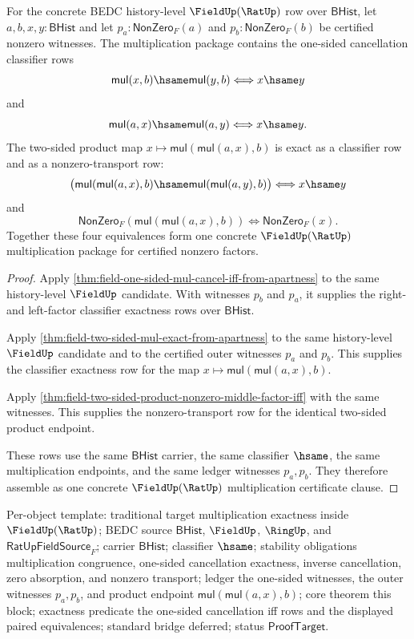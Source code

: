 \begin{theorem}
\label{thm:ratup-fieldup-product-classifier-and-nonzero-exit-package}
For the concrete BEDC history-level $\FieldUp(\RatUp)$ row over
$\mathsf{BHist}$, let $a,b,x,y:\mathsf{BHist}$ and let
$p_a:\mathsf{NonZero}_F(a)$ and $p_b:\mathsf{NonZero}_F(b)$ be certified
nonzero witnesses. The multiplication package contains the one-sided
cancellation classifier rows
$$
\mathsf{mul}(x,b)\hsame\mathsf{mul}(y,b)
\Longleftrightarrow
x\hsame y
$$
and
$$
\mathsf{mul}(a,x)\hsame\mathsf{mul}(a,y)
\Longleftrightarrow
x\hsame y.
$$
The two-sided product map $x\mapsto\mathsf{mul}(\mathsf{mul}(a,x),b)$ is exact
as a classifier row and as a nonzero-transport row:
$$
\bigl(\mathsf{mul}(\mathsf{mul}(a,x),b)
\hsame
\mathsf{mul}(\mathsf{mul}(a,y),b)\bigr)
\Longleftrightarrow
x\hsame y
$$
and
$$
\mathsf{NonZero}_F(\mathsf{mul}(\mathsf{mul}(a,x),b))
\Longleftrightarrow
\mathsf{NonZero}_F(x).
$$
Together these four equivalences form one concrete
$\FieldUp(\RatUp)$ multiplication package for certified nonzero factors.
\end{theorem}
\begin{proof}
Apply
\autoref{thm:field-one-sided-mul-cancel-iff-from-apartness} to the same
history-level $\FieldUp$ candidate. With witnesses $p_b$ and $p_a$, it supplies
the right- and left-factor classifier exactness rows over $\mathsf{BHist}$.

Apply \autoref{thm:field-two-sided-mul-exact-from-apartness} to the same
history-level $\FieldUp$ candidate and to the certified outer witnesses
$p_a$ and $p_b$. This supplies the classifier exactness row for the map
$x\mapsto\mathsf{mul}(\mathsf{mul}(a,x),b)$.

Apply
\autoref{thm:field-two-sided-product-nonzero-middle-factor-iff} with the
same witnesses. This supplies the nonzero-transport row for the identical
two-sided product endpoint.

These rows use the same $\mathsf{BHist}$ carrier, the same classifier
$\hsame$, the same multiplication endpoints, and the same ledger witnesses
$p_a,p_b$. They therefore assemble as one concrete
$\FieldUp(\RatUp)$ multiplication certificate clause.
\end{proof}

Per-object template: traditional target multiplication exactness inside
$\FieldUp(\RatUp)$; BEDC source $\mathsf{BHist}$, $\FieldUp$, $\RingUp$, and
$\mathsf{RatUpFieldSource}_F$; carrier $\mathsf{BHist}$; classifier
$\hsame$; stability obligations multiplication congruence, one-sided
cancellation exactness, inverse cancellation, zero absorption, and nonzero
transport; ledger the one-sided witnesses, the outer witnesses $p_a,p_b$, and
product endpoint
$\mathsf{mul}(\mathsf{mul}(a,x),b)$; core theorem this block; exactness
predicate the one-sided cancellation iff rows and the displayed paired
equivalences; standard bridge deferred; status $\mathsf{ProofTarget}$.
